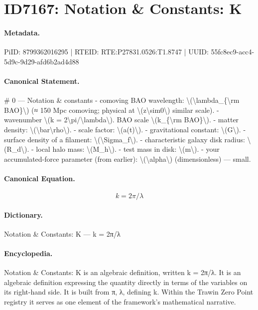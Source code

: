 \section*{ID7167: Notation \& Constants: K}
\paragraph{Metadata.}
PiID: 8799362016295 | RTEID: RTE:P27831.0526:T1.8747 | UUID: 55fc8ec9-acc4-5d9c-9d29-afd6b2ad4d88

\paragraph{Canonical Statement.}
\# 0 — Notation \& constants - comoving BAO wavelength: \textbackslash{}(\textbackslash{}lambda\_\{\textbackslash{}rm BAO\}\textbackslash{}) (≈ 150 Mpc comoving; physical at \textbackslash{}(z\textbackslash{}sim0\textbackslash{}) similar scale). - wavenumber \textbackslash{}(k = 2\textbackslash{}pi/\textbackslash{}lambda\textbackslash{}). BAO scale \textbackslash{}(k\_\{\textbackslash{}rm BAO\}\textbackslash{}). - matter density: \textbackslash{}(\textbackslash{}bar\textbackslash{}rho\textbackslash{}). - scale factor: \textbackslash{}(a(t)\textbackslash{}). - gravitational constant: \textbackslash{}(G\textbackslash{}). - surface density of a filament: \textbackslash{}(\textbackslash{}Sigma\_f\textbackslash{}). - characteristic galaxy disk radius: \textbackslash{}(R\_d\textbackslash{}). - local halo mass: \textbackslash{}(M\_h\textbackslash{}). - test mass in disk: \textbackslash{}(m\textbackslash{}). - your accumulated-force parameter (from earlier): \textbackslash{}(\textbackslash{}alpha\textbackslash{}) (dimensionless) — small.

\paragraph{Canonical Equation.}
\[
k = 2\pi/\lambda
\]

\paragraph{Dictionary.}
Notation \& Constants: K — k = 2π/λ

\paragraph{Encyclopedia.}
Notation \& Constants: K is an algebraic definition, written k = 2π/λ. It is an algebraic definition expressing the quantity directly in terms of the variables on its right-hand side. It is built from π, λ, defining k. Within the Trawin Zero Point registry it serves as one element of the framework's mathematical narrative.
